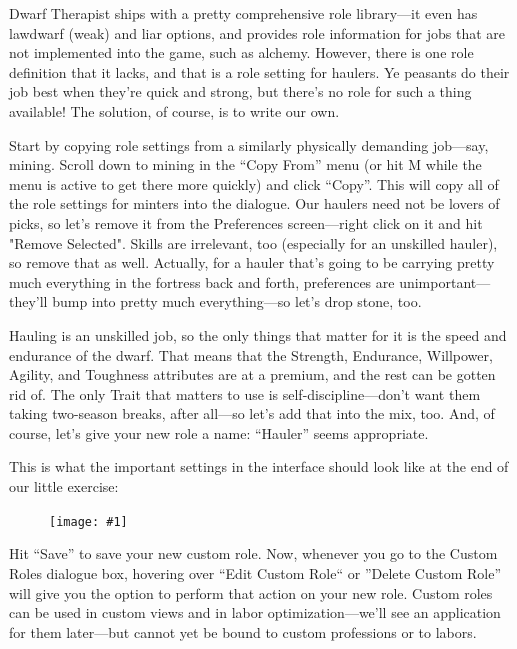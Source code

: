 \documentclass[]{article}
\newcommand{\legacy}[1] {
\begin{center}
\colorbox{legacy-content}{
\begin{minipage}[t]{0.95\linewidth}
#1
\end{minipage}
}
\end{center}
}
\newcommand{\fullfigure}[1] {
\begin{figure}[h!]
\texttt{[image: \#1]}
\end{figure}
}
\begin{document}
Dwarf Therapist ships with a pretty comprehensive role library---it even has lawdwarf (weak) and liar
options, and provides role information for jobs that are not implemented into the game, such as alchemy.
However, there is one role definition that it lacks, and that is a role setting for haulers. Ye peasants
do their job best when they're quick and strong, but there's no role for such a thing available! The
solution, of course, is to write our own.

Start by copying role settings from a similarly physically demanding job---say, mining. Scroll down to
mining in the ``Copy From'' menu (or hit M while the menu is active to get there more quickly) and click
``Copy''. This will copy all of the role settings for minters into the dialogue. Our haulers need not be
lovers of picks, so let's remove it from the Preferences screen---right click on it and hit "Remove
Selected". Skills are irrelevant, too (especially for an unskilled hauler), so remove that as well.
Actually, for a hauler that's going to be carrying pretty much everything in the fortress back and forth,
preferences are unimportant---they'll bump into pretty much everything---so let's drop stone, too.

Hauling is an unskilled job, so the only things that matter for it is the speed and endurance of the
dwarf. That means that the Strength, Endurance, Willpower, Agility, and Toughness attributes are at a
premium, and the rest can be gotten rid of. The only Trait that matters to use is self-discipline---don't
want them taking two-season breaks, after all---so let's add that into the mix, too. And, of course,
let's give your new role a name: ``Hauler'' seems appropriate.

This is what the important settings in the interface should look like at the end of our little exercise:

\fullfigure{Sec3Fig9}

Hit ``Save'' to save your new custom role. Now, whenever you go to the Custom Roles dialogue box, hovering
over ``Edit Custom Role`` or ''Delete Custom Role'' will give you the option to perform that action on your
new role. Custom roles can be used in custom views and in labor optimization---we'll see an application
for them later---but cannot yet be bound to custom professions or to labors.
\end{document}
